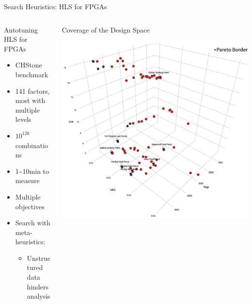 \documentclass[10pt, compress, aspectratio=169, xcolor={table,usenames,dvipsnames}]{beamer}
\begin{document}
\begin{frame}[label={sec:org34b32f6}]{Search Heuristics: HLS for FPGAs}
\begin{columns}
\begin{column}{0.4\columnwidth}
\begin{block}{Autotuning HLS for FPGAs}
\begin{itemize}
\item CHStone benchmark
\item 141 factors, most with multiple levels
\item \alert{\(10^{128}\)} combinations
\item \alert{1\textasciitilde{}10min} to measure
\item \alert{Multiple objectives}
\item Search with meta-heuristics:
\begin{itemize}
\item Unstructured data hinders analysis
\end{itemize}
\end{itemize}
\end{block}
\end{column}
\begin{column}{0.6\columnwidth}
\begin{block}{Coverage of the Design Space}
\begin{center}
\includegraphics[width=.85\columnwidth]{../../../img/fpga_space.png}
\end{center}
\end{block}
\end{column}
\end{columns}
\end{frame}
\end{document}
